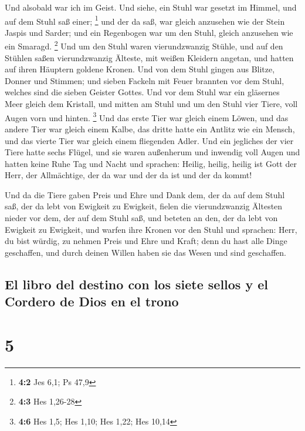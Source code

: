  Und alsobald war ich im Geist. Und siehe, ein Stuhl war
gesetzt im Himmel, und auf dem Stuhl saß einer; \footnote{\textbf{4:2}
  Jes 6,1; Ps 47,9}  und der da saß, war gleich anzusehen
wie der Stein Jaspis und Sarder; und ein Regenbogen war um den Stuhl,
gleich anzusehen wie ein Smaragd. \footnote{\textbf{4:3} Hes 1,26-28}
 Und um den Stuhl waren vierundzwanzig Stühle, und auf den
Stühlen saßen vierundzwanzig Älteste, mit weißen Kleidern angetan, und
hatten auf ihren Häuptern goldene Kronen.  Und von dem
Stuhl gingen aus Blitze, Donner und Stimmen; und sieben Fackeln mit
Feuer brannten vor dem Stuhl, welches sind die sieben Geister Gottes.
 Und vor dem Stuhl war ein gläsernes Meer gleich dem
Kristall, und mitten am Stuhl und um den Stuhl vier Tiere, voll Augen
vorn und hinten. \footnote{\textbf{4:6} Hes 1,5; Hes 1,10; Hes 1,22; Hes
  10,14}  Und das erste Tier war gleich einem Löwen, und
das andere Tier war gleich einem Kalbe, das dritte hatte ein Antlitz wie
ein Mensch, und das vierte Tier war gleich einem fliegenden Adler.
 Und ein jegliches der vier Tiere hatte sechs Flügel, und
sie waren außenherum und inwendig voll Augen und hatten keine Ruhe Tag
und Nacht und sprachen: Heilig, heilig, heilig ist Gott der Herr, der
Allmächtige, der da war und der da ist und der da kommt!

 Und da die Tiere gaben Preis und Ehre und Dank dem, der
da auf dem Stuhl saß, der da lebt von Ewigkeit zu Ewigkeit,
 fielen die vierundzwanzig Ältesten nieder vor dem, der
auf dem Stuhl saß, und beteten an den, der da lebt von Ewigkeit zu
Ewigkeit, und warfen ihre Kronen vor den Stuhl und sprachen:
 Herr, du bist würdig, zu nehmen Preis und Ehre und
Kraft; denn du hast alle Dinge geschaffen, und durch deinen Willen haben
sie das Wesen und sind geschaffen.

\hypertarget{el-libro-del-destino-con-los-siete-sellos-y-el-cordero-de-dios-en-el-trono}{%
\subsection{El libro del destino con los siete sellos y el Cordero de
Dios en el
trono}\label{el-libro-del-destino-con-los-siete-sellos-y-el-cordero-de-dios-en-el-trono}}

\hypertarget{section-4}{%
\section{5}\label{section-4}}

